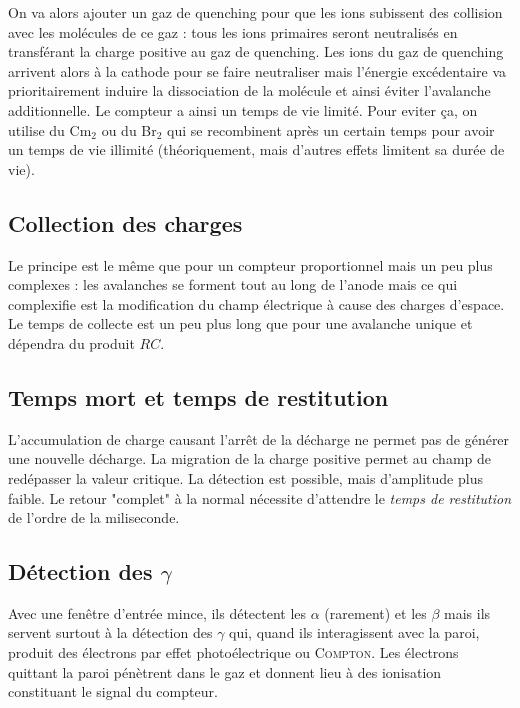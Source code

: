 On va alors ajouter un gaz de quenching pour que les ions subissent des collision avec les molécules
de ce gaz : tous les ions primaires seront neutralisés en transférant la charge positive au gaz de 
quenching. Les ions du gaz de quenching arrivent alors à la cathode pour se faire neutraliser mais
l'énergie excédentaire va prioritairement induire la dissociation de la molécule et ainsi éviter
l'avalanche additionnelle. Le compteur a ainsi un temps de vie limité. Pour eviter ça, on utilise
du Cm$_2$ ou du Br$_2$ qui se recombinent après un certain temps pour avoir un temps de vie 
illimité (théoriquement, mais d'autres effets limitent sa durée de vie).


\subsection{Collection des charges}%
Le principe est le même que pour un compteur proportionnel mais un peu plus complexes : les avalanches
se forment tout au long de l'anode mais ce qui complexifie est la modification du champ électrique
à cause des charges d'espace. Le temps de collecte est un peu plus long que pour une avalanche
unique et dépendra du produit $RC$.

\subsection{Temps mort et temps de restitution}%
L'accumulation de charge causant l'arrêt de la décharge ne permet pas de générer une nouvelle 
décharge. La migration de la charge positive permet au champ de redépasser la valeur critique. La
détection est possible, mais d'amplitude plus faible. Le retour "complet" à la normal nécessite 
d'attendre le \textit{temps de restitution} de l'ordre de la miliseconde.


\subsection{Détection des $\gamma$}%
Avec une fenêtre d'entrée mince, ils détectent les $\alpha$ (rarement) et les $\beta$ mais ils servent
surtout à la détection des $\gamma$ qui, quand ils interagissent avec la paroi, produit des électrons
par effet photoélectrique ou \textsc{Compton}. Les électrons quittant la paroi pénètrent dans le
gaz et donnent lieu à des ionisation constituant le signal du compteur.\\

